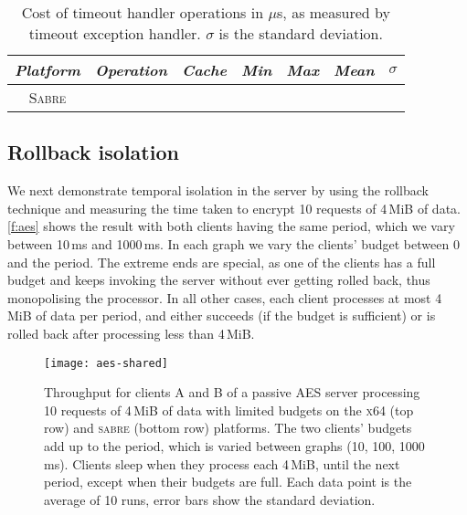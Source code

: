 \begin{table}[t]\centering
\begin{tabular}{cllrrrr}\toprule
\emph{Platform} & \emph{Operation} & \emph{Cache} & \emph{Min} &
                          \emph{Max} & \emph{Mean} &
                          \multicolumn{1}{c}{\boldmath \(\sigma\)} \\\midrule
                          \multirow{8}{*}{\textsc{Sabre}} 
                           
                          \midrule
                          \multirow{8}{*}{\textsc{x64}}
                          
                          \bottomrule
\end{tabular}
\caption{Cost of timeout handler operations in \(\mu\)s, as measured
  by timeout exception handler. \(\sigma\) is the standard deviation.}
\label{t:rollback}
\end{table}

\subsection{Rollback isolation}

We next demonstrate temporal isolation in the server by using the rollback
technique and measuring the time taken to encrypt 10 requests of 4\,MiB of
data. \autoref{f:aes} shows the result with both clients having the same
period, which we vary between 10\,ms and 1000\,ms.
In each graph  we vary the clients' budget between 0 and the
period. The extreme ends are special, as one of the clients has a full
budget and keeps invoking the server without ever getting rolled back,
thus monopolising the processor. In all other cases, each client
processes at most 4\,MiB of data per period, and either succeeds (if
the budget is sufficient) or is rolled back after processing less than 4\,MiB.

\begin{figure*}[t]
  \centering
  \texttt{[image: aes-shared]}
  \caption{Throughput for clients A and B of a passive AES server processing 10 requests of 4\,MiB of data with
      limited budgets on the \textsc{x64} (top row) and \textsc{sabre} (bottom row) platforms. The two clients' budgets
      add up to the period, which is varied between graphs (10, 100, 1000\,ms). Clients sleep when
      they process each 4\,MiB, until the next period, except when their budgets are full. Each data point is the average of 10 runs, error bars show the standard deviation.}
  \label{f:aes}
\end{figure*}


